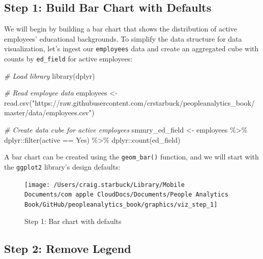 \documentclass[
]{book}
\newenvironment{Shaded}{\begin{snugshade}}{\end{snugshade}}
\newcommand{\CommentTok}[1]{\textcolor[rgb]{0.56,0.35,0.01}{\textit{#1}}}
\newcommand{\FunctionTok}[1]{\textcolor[rgb]{0.00,0.00,0.00}{#1}}
\newcommand{\NormalTok}[1]{#1}
\newcommand{\OtherTok}[1]{\textcolor[rgb]{0.56,0.35,0.01}{#1}}
\newcommand{\SpecialCharTok}[1]{\textcolor[rgb]{0.00,0.00,0.00}{#1}}
\newcommand{\StringTok}[1]{\textcolor[rgb]{0.31,0.60,0.02}{#1}}
\begin{document}
\hypertarget{step-1-build-bar-chart-with-defaults}{%
\subsection{Step 1: Build Bar Chart with Defaults}\label{step-1-build-bar-chart-with-defaults}}

We will begin by building a bar chart that shows the distribution of active employees' educational backgrounds. To simplify the data structure for data visualization, let's ingest our \texttt{employees} data and create an aggregated cube with counts by \texttt{ed\_field} for active employees:

\begin{Shaded}
\begin{Highlighting}[]
\CommentTok{\# Load library}
\FunctionTok{library}\NormalTok{(dplyr)}

\CommentTok{\# Read employee data}
\NormalTok{employees }\OtherTok{\textless{}{-}} \FunctionTok{read.csv}\NormalTok{(}\StringTok{"https://raw.githubusercontent.com/crstarbuck/peopleanalytics\_book/master/data/employees.csv"}\NormalTok{)}

\CommentTok{\# Create data cube for active employees}
\NormalTok{smmry\_ed\_field }\OtherTok{\textless{}{-}}\NormalTok{ employees }\SpecialCharTok{\%\textgreater{}\%}
\NormalTok{                  dplyr}\SpecialCharTok{::}\FunctionTok{filter}\NormalTok{(active }\SpecialCharTok{==} \StringTok{\textquotesingle{}Yes\textquotesingle{}}\NormalTok{) }\SpecialCharTok{\%\textgreater{}\%}
\NormalTok{                  dplyr}\SpecialCharTok{::}\FunctionTok{count}\NormalTok{(ed\_field)}
\end{Highlighting}
\end{Shaded}

A bar chart can be created using the \texttt{geom\_bar()} function, and we will start with the \texttt{ggplot2} library's design defaults:

\begin{figure}

{\centering \texttt{[image: /Users/craig.starbuck/Library/Mobile Documents/com~apple~CloudDocs/Documents/People Analytics Book/GitHub/peopleanalytics\_book/graphics/viz\_step\_1]} 

}

\caption{Step 1: Bar chart with defaults}\label{fig:barchart-1}
\end{figure}

\hypertarget{step-2-remove-legend}{%
\subsection{Step 2: Remove Legend}\label{step-2-remove-legend}}
\end{document}
